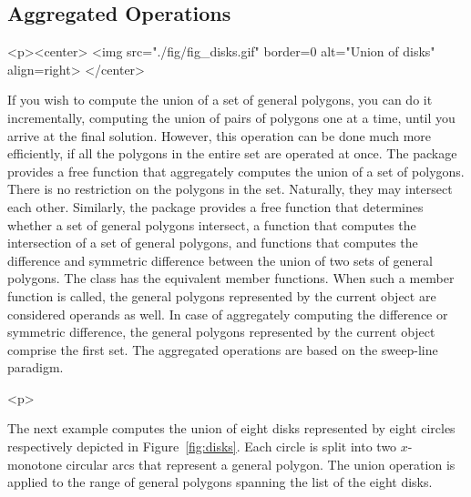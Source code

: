 \subsection{Aggregated Operations}
\label{bso_ssec:}
\lcHtml{\label{fig:disks}}
\begin{ccHtmlOnly}
  <p><center>
    <img src="./fig/fig_disks.gif" border=0 alt="Union of disks" align=right>
  </center>
\end{ccHtmlOnly}
If you wish to compute the union of a set of general polygons, you can
do it incrementally, computing the union of pairs of polygons one at a
time, until you arrive at the final solution. However, this operation
can be done much more efficiently, if all the polygons in the entire
set are operated at once. The package provides a free function that
aggregately computes the union of a set of polygons. There is no
restriction on the polygons in the set. Naturally, they may intersect
each other. Similarly, the package provides a free function that
determines whether a set of general polygons intersect, a function
that computes the intersection of a set of general polygons, and
functions that computes the difference and symmetric difference between
the union of two sets of general polygons. The class
 has the equivalent member functions. When
such a member function is called, the general polygons represented by
the current object are considered operands as well. In case of
aggregately computing the difference or symmetric difference, the
general polygons represented by the current object comprise the first
set. The aggregated operations are based on the sweep-line
paradigm. 

\begin{ccHtmlOnly}<p>\end{ccHtmlOnly}
The next example computes the union of eight disks represented by
eight circles respectively depicted in Figure~\ref{fig:disks}. Each
circle is split into two $x$-monotone circular arcs that represent a
general polygon. The union operation is applied to the range of
general polygons spanning the list of the eight disks.

